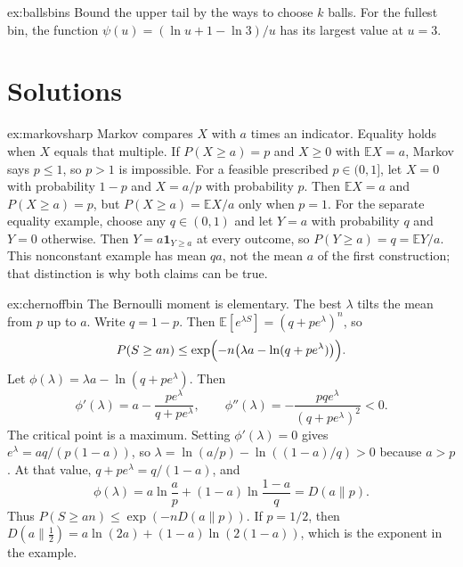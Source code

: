 \begin{hint}{ex:ballsbins}
Bound the upper tail by the ways to choose $k$ balls. For the fullest bin, the function $\psi(u)=(\ln u+1-\ln3)/u$ has its largest value at $u=3$.
\end{hint}

\section{Solutions}

\begin{solution}{ex:markovsharp}
\idea Markov compares $X$ with $a$ times an indicator. Equality holds when $X$ equals that multiple.
\writeup If $P(X\ge a)=p$ and $X\ge0$ with $\mathbb E X=a$, Markov says $p\le1$, so $p>1$ is impossible. For a feasible prescribed $p\in(0,1]$, let $X=0$ with probability $1-p$ and $X=a/p$ with probability $p$. Then $\mathbb E X=a$ and $P(X\ge a)=p$, but $P(X\ge a)=\mathbb E X/a$ only when $p=1$. For the separate equality example, choose any $q\in(0,1)$ and let $Y=a$ with probability $q$ and $Y=0$ otherwise. Then $Y=a\mathbf 1_{Y\ge a}$ at every outcome, so $P(Y\ge a)=q=\mathbb EY/a$. This nonconstant example has mean $qa$, not the mean $a$ of the first construction; that distinction is why both claims can be true.
\end{solution}

\begin{solution}{ex:chernoffbin}
\idea The Bernoulli moment is elementary. The best $\lambda$ tilts the mean from $p$ up to $a$.
\writeup Write $q=1-p$. Then $\mathbb E[e^{\lambda S}]=(q+pe^{\lambda})^n$, so
\[
 P(S\ge an)\le\exp\Bigl(-n\bigl(\lambda a-\ln(q+pe^{\lambda})\bigr)\Bigr).
\]
Let $\phi(\lambda)=\lambda a-\ln(q+pe^{\lambda})$. Then
\[
 \phi'(\lambda)=a-\frac{pe^{\lambda}}{q+pe^{\lambda}},\qquad
 \phi''(\lambda)=-\frac{pqe^{\lambda}}{(q+pe^{\lambda})^2}<0.
\]
The critical point is a maximum. Setting $\phi'(\lambda)=0$ gives $e^{\lambda}=aq/(p(1-a))$, so $\lambda=\ln(a/p)-\ln((1-a)/q)>0$ because $a>p$. At that value, $q+pe^{\lambda}=q/(1-a)$, and
\[
 \phi(\lambda)=a\ln\frac{a}{p}+(1-a)\ln\frac{1-a}{q}=D(a\|p).
\]
Thus $P(S\ge an)\le\exp(-n D(a\|p))$. If $p=1/2$, then $D(a\|\tfrac12)=a\ln(2a)+(1-a)\ln(2(1-a))$, which is the exponent in the example.
\end{solution}

